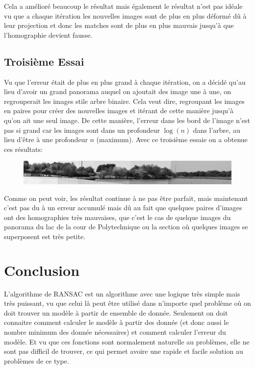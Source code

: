 \documentclass[11pt]{article}
\begin{document}
Cela a amélioré beaucoup le résultat mais également le résultat n’est pas idéale vu que a chaque itération les nouvelles images sont de plus en plus déformé dû à leur projection et donc les matches sont de plus en plus mauvais jusqu’à que l’homographie devient fausse.

\subsection{Troisième Essai}

Vu que l’erreur était de plus en plus grand à chaque itération, on a décidé qu’au lieu d’avoir un grand panorama auquel on ajoutait des image une à une, on regrouperait les images stile arbre binaire. Cela veut dire, regroupant les images en paires pour créer des nouvelles images et itérant de cette manière jusqu’à qu’on ait une seul image.  De cette manière, l’erreur dans les bord de l’image n’est pas si grand car les images sont dans un profondeur $\log(n)$ dans l’arbre, au lieu d’être à une profondeur $n$ (maximum).
Avec ce troisième essaie on a obtenue ces résultats:

\begin{figure}[H]
\centering
\includegraphics[width=.8\textwidth]{../resources/output/best_panorama.jpg}
\end{figure}

Comme on peut voir, les résultat continue à ne pas être parfait, mais maintenant c’est pas du à un erreur accumulé mais dû au fait que quelques paires d’images ont des homographies très mauvaises, que c’est le cas de quelque images du panorama du lac de la cour de Polytechnique ou la section où quelques images se superposent est très petite.

\section{Conclusion}

L’algorithme de RANSAC est un algorithme avec une logique très simple mais très puissant, vu que celui là peut être utilisé dans n’importe quel problème où on doit trouver un modèle à partir de ensemble de donnée. Seulement on doit connaitre comment calculer le modèle à partir des donnée (et donc aussi le nombre minimum des donnée nécessaires) et comment calculer l’erreur du modèle. Et vu que ces fonctions sont normalement naturelle au problèmes, elle ne sont pas difficil de trouver, ce qui permet avoire une rapide et facile solution au problèmes de ce type. 
\end{document}
